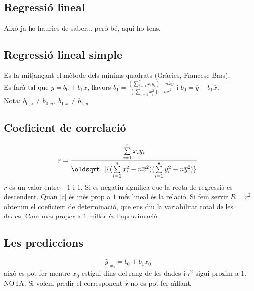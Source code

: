 \documentclass[a4paper]{sciposter}
\renewcommand*{\sqrt}[2][\ ]{\oldsqrt[#1]{#2} }
\begin{document}
\begin{multicols}{3}
\section{Regressió lineal}
Això ja ho hauries de saber... però bé, aquí ho tens.
\subsection{Regressió lineal simple}
Es fa mitjançant el mètode dels mínims quadrats (Gràcies, Francesc Bars).\\
Es farà tal que $y = b_0 + b_1x$, llavors $b_1 = \frac{(\sum\limits_{i=1}^nx_iy_i) - n\overline{x}\overline{y}}{(\sum\limits_{i=1}^nx_i^2) - n\overline{x}^2}$ i $b_0 = \overline{y} - b_1\overline{x}$.\\
Nota: $b_{0,x} \neq b_{0,y},\;b_{1,x} \neq b_{1,y}$
\subsection{Coeficient de correlació}
\begin{displaymath}
r = \frac{\sum\limits_{i=1}^nx_iy_i}{\sqrt{(\sum\limits_{i=1}^nx_i^2 - n\overline{x}^2)(\sum\limits_{i=1}^ny_i^2 - n\overline{y}^2)}}
\end{displaymath}
$r$ és un valor entre $-1$ i $1$. Si es negatiu significa que la recta de regressió es descendent. Quan $|r|$ és més prop a $1$ més lineal és la relació.
Si fem servir $R = r^2$ obtenim el coeficient de determinació, que ens diu la variabilitat total de les dades. Com més proper a $1$ millor és l'aproximació.
\subsection{Les prediccions}
\begin{displaymath}
	\hat{y}|_{x_0} = b_0 + b_1x_0
\end{displaymath}
això es pot fer mentre $x_0$ estigui dins del rang de les dades i $r^2$ sigui proxim a $1$.
NOTA: Si volem predir el corresponent $\hat{x}$ no es pot fer aïllant.\\

\end{multicols}
\end{document}
